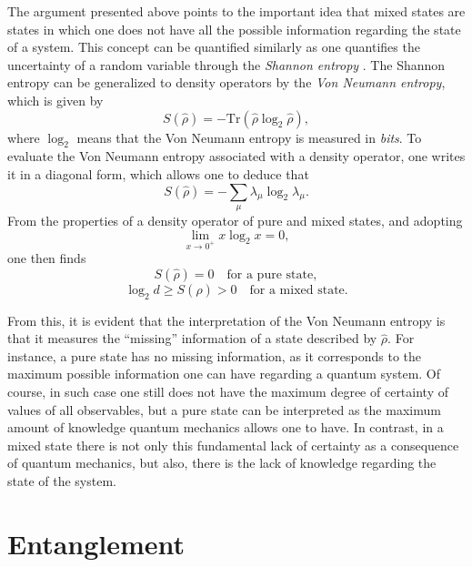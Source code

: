 \documentclass[
12pt,		%
openright,	%
twoside,  %
a4paper,			%
chapter=TITLE,		%
english,			%
french,				%
spanish,			%
brazil				%
]{USPSC-classe/USPSC}
\begin{document}
\begin{apendicesenv}
The argument presented above points to the important idea that mixed states are states in which one does not have all the possible information regarding the state of a system. This concept can be quantified similarly as one quantifies the uncertainty of a random variable through the \textit{Shannon entropy} \cite{Nielsen2010}. The Shannon entropy can be generalized to density operators by the \textit{Von Neumann entropy}, which is given by
\begin{equation}
    S(\hat{\rho})=-\text{Tr}(\hat{\rho}\log_2\hat{\rho}),
\end{equation}
where $\log_2$ means that the Von Neumann entropy is measured in \textit{bits}. To evaluate the Von Neumann entropy associated with a density operator, one writes it in a diagonal form, which allows one to deduce that 
\begin{equation}
    S(\hat{\rho})=-\sum_{\mu}\lambda_{\mu}\log_2\lambda_{\mu}.
\end{equation}
From the properties of a density operator of pure and mixed states, and adopting
\begin{equation}
    \lim_{x\to 0^+}x\log_2{x}=0,
\end{equation}
one then finds
\begin{equation}
    S(\hat{\rho})=0\quad \text{for a pure state},
\end{equation}
\begin{equation}
    \log_2{d}\geq S(\hat{\rho})>0\quad \text{for a mixed state}.
\end{equation}

From this, it is evident that the interpretation of the Von Neumann entropy is that it measures the ``missing'' information of a state described by $\hat{\rho}$. For instance, a pure state has no missing information, as it corresponds to the maximum possible information one can have regarding a quantum system. Of course, in such case one still does not have the maximum degree of certainty of values of all observables, but a pure state can be interpreted as the maximum amount of knowledge quantum mechanics allows one to have. In contrast, in a mixed state there is not only this fundamental lack of certainty as a consequence of quantum mechanics, but also, there is the lack of knowledge regarding the state of the system.

\section{Entanglement}\label{entanglement}


\end{apendicesenv}
\end{document}

